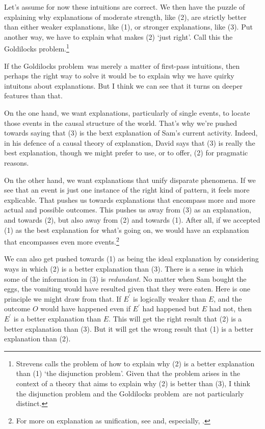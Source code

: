 Let's assume for now these intuitions are correct. We then have the puzzle of explaining why explanations of moderate strength, like (2), are strictly better than either weaker explanations, like (1), or stronger explanations, like (3). Put another way, we have to explain what makes (2) `just right'. Call this the Goldilocks problem.\footnote{Strevens calls the problem of how to explain why (2) is a better explanation than (1) `the disjunction problem'. Given that the problem arises in the context of a theory that aims to explain why (2) is better than (3), I think the disjunction problem and the Goldilocks problem\ are not particularly distinct.}

If the Goldilocks problem\ was merely a matter of first-pass intuitions, then perhaps the right way to solve it would be to explain why we have quirky intuitons about explanations. But I think we can see that it turns on deeper features than that. 

On the one hand, we want explanations, particularly of single events, to locate those events in the causal structure of the world. That's why we're pushed towards saying that (3) is the bext explanation of Sam's current activity. Indeed, in his defence of a causal theory of explanation, David \citet{Lewis1986f} says that (3) is really the best explanation, though we might prefer to use, or to offer, (2) for pragmatic reasons.

On the other hand, we want explanations that unify disparate phenomena. If we see that an event is just one instance of the right kind of pattern, it feels more explicable. That pushes us towards explanations that encompass more and more actual and possible outcomes. This pushes us away from (3) as an explanation, and towards (2), but also away from (2) and towards (1). After all, if we accepted (1) as the best explanation for what's going on, we would have an explanation that encompasses even more events.\footnote{For more on explanation as unification, see \citet{Friedman1974} and, especially, \citet{Kitcher1989}.}%

We can also get pushed towards (1) as being the ideal explanation by considering ways in which (2) is a better explanation than (3). There is a sense in which some of the information in (3) is \textit{redundant}. No matter when Sam bought the eggs, the vomiting would have resulted given that they were eaten. Here is one principle we might draw from that. If $E^\prime$ is logically weaker than $E$, and the outcome $O$ would have happened even if $E^\prime$ had happened but $E$ had not, then $E^\prime$ is a better explanation than $E$. This will get the right result that (2) is a better explanation than (3). But it will get the wrong result that (1) is a better explanation than (2).

